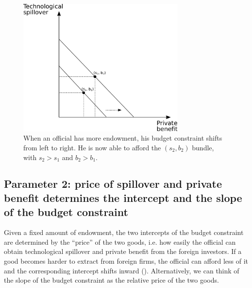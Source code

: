 \begin{figure}[!ht]
	\centering
    \includegraphics[width=0.75\textwidth, height=0.75\textheight,keepaspectratio]{../figure/budget_constraint}
    \caption{When an official has more endowment, his budget constraint shifts from left to right. He is now able to afford the $(s_2, b_2)$ bundle, with $s_2 > s_1$ and $b_2 > b_1$.}
    \label{fig:budget_constraint}
\end{figure}

\subsection{Parameter 2: price of spillover and private benefit determines the intercept and the slope of the budget constraint}

Given a fixed amount of endowment, the two intercepts of the budget constraint are determined by the ``price'' of the two goods, i.e. how easily the official can obtain technological spillover and private benefit from the foreign investors. If a good becomes harder to extract from foreign firms, the official can afford less of it and the corresponding intercept shifts inward (). Alternatively, we can think of the slope of the budget constraint as the relative price of the two goods.

